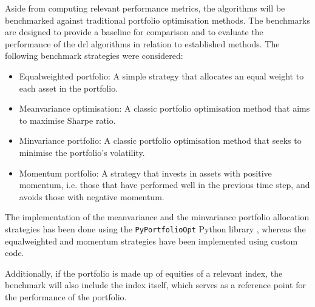 Aside from computing relevant performance metrics, the algorithms will be benchmarked against traditional portfolio optimisation methods. The benchmarks are designed to provide a baseline for comparison and to evaluate the performance of the \acrshort{drl} algorithms in relation to established methods. The following benchmark strategies were considered:
\begin{itemize}
    \item Equal\-weighted portfolio: A simple strategy that allocates an equal weight to each asset in the portfolio.
    \item Mean\-variance optimisation: A classic portfolio optimisation method that aims to maximise Sharpe ratio. 
    \item Min\-variance portfolio: A classic portfolio optimisation method that seeks to minimise the portfolio's volatility. 
    \item Momentum portfolio: A strategy that invests in assets with positive momentum, i.e. those that have performed well in the previous time step, and avoids those with negative momentum.
\end{itemize}

The implementation of the mean\-variance and the min\-variance portfolio allocation strategies has been done using the \texttt{PyPortfolioOpt} Python library \cite{Martin2021}, whereas the equal\-weighted and momentum strategies have been implemented using custom code. 

Additionally, if the portfolio is made up of equities of a relevant index, the benchmark will also include the index itself, which serves as a reference point for the performance of the portfolio. 
